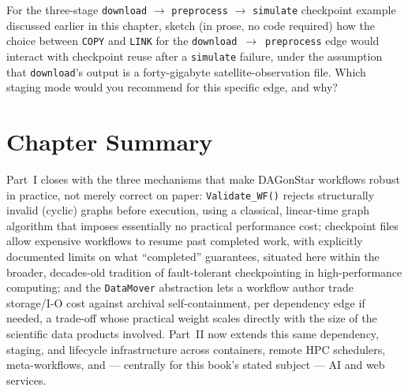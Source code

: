 \begin{exercise}
For the three-stage \texttt{download} $\to$ \texttt{preprocess} $\to$
\texttt{simulate} checkpoint example discussed earlier in this chapter,
sketch (in prose, no code required) how the choice between \texttt{COPY} and
\texttt{LINK} for the \texttt{download}~$\to$~\texttt{preprocess} edge would
interact with checkpoint reuse after a \texttt{simulate} failure, under the
assumption that \texttt{download}'s output is a forty-gigabyte
satellite-observation file. Which staging mode would you recommend for this
specific edge, and why?
\end{exercise}

\section{Chapter Summary}

Part~I closes with the three mechanisms that make DAGonStar workflows robust
in practice, not merely correct on paper: \texttt{Validate\_WF()} rejects
structurally invalid (cyclic) graphs before execution, using a classical,
linear-time graph algorithm that imposes essentially no practical
performance cost; checkpoint files allow expensive workflows to resume past
completed work, with explicitly documented limits on what ``completed''
guarantees, situated here within the broader, decades-old tradition of
fault-tolerant checkpointing in high-performance computing; and the
\texttt{DataMover} abstraction lets a workflow author trade storage/I-O cost
against archival self-containment, per dependency edge if needed, a
trade-off whose practical weight scales directly with the size of the
scientific data products involved. Part~II now extends this same
dependency, staging, and lifecycle infrastructure across containers, remote
HPC schedulers, meta-workflows, and --- centrally for this book's stated
subject --- AI and web services.
